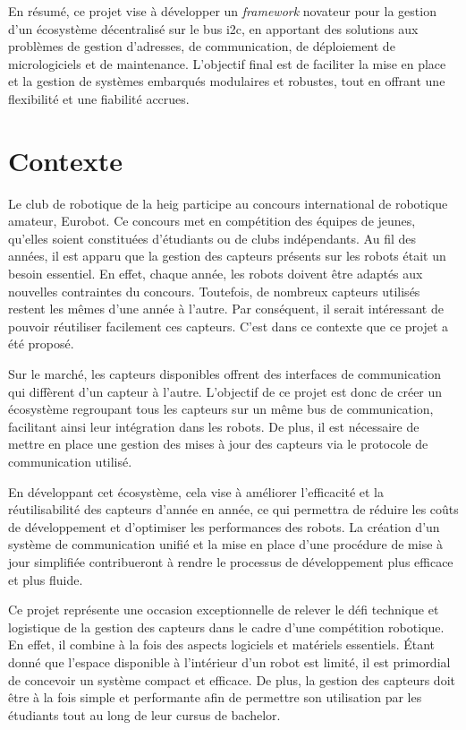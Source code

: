 En résumé, ce projet vise à développer un \textit{\gls{framework}} novateur pour la gestion d'un écosystème décentralisé sur le bus \gls{i2c}, en apportant des solutions aux problèmes de gestion d'adresses, de communication, de déploiement de micrologiciels et de maintenance.
L'objectif final est de faciliter la mise en place et la gestion de systèmes embarqués modulaires et robustes, tout en offrant une flexibilité et une fiabilité accrues.

\section{Contexte}
Le club de robotique de la \gls{heig} participe au concours international de robotique amateur, Eurobot.
Ce concours met en compétition des équipes de jeunes, qu'elles soient constituées d'étudiants ou de clubs indépendants.
Au fil des années, il est apparu que la gestion des capteurs présents sur les robots était un besoin essentiel.
En effet, chaque année, les robots doivent être adaptés aux nouvelles contraintes du concours.
Toutefois, de nombreux capteurs utilisés restent les mêmes d'une année à l'autre.
Par conséquent, il serait intéressant de pouvoir réutiliser facilement ces capteurs.
C'est dans ce contexte que ce projet a été proposé.

Sur le marché, les capteurs disponibles offrent des interfaces de communication qui diffèrent d'un capteur à l'autre.
L'objectif de ce projet est donc de créer un écosystème regroupant tous les capteurs sur un même bus de communication, facilitant ainsi leur intégration dans les robots.
De plus, il est nécessaire de mettre en place une gestion des mises à jour des capteurs via le protocole de communication utilisé.

En développant cet écosystème, cela vise à améliorer l'efficacité et la réutilisabilité des capteurs d'année en année, ce qui permettra de réduire les coûts de développement et d'optimiser les performances des robots.
La création d'un système de communication unifié et la mise en place d'une procédure de mise à jour simplifiée contribueront à rendre le processus de développement plus efficace et plus fluide.

Ce projet représente une occasion exceptionnelle de relever le défi technique et logistique de la gestion des capteurs dans le cadre d'une compétition robotique.
En effet, il combine à la fois des aspects logiciels et matériels essentiels.
Étant donné que l'espace disponible à l'intérieur d'un robot est limité, il est primordial de concevoir un système compact et efficace.
De plus, la gestion des capteurs doit être à la fois simple et performante afin de permettre son utilisation par les étudiants tout au long de leur cursus de bachelor.